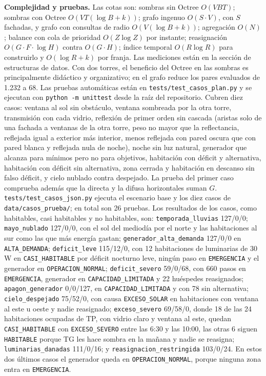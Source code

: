 \documentclass[12pt,a4paper]{article}
\newcommand{\estado}[1]{\texttt{#1}}
\newcommand{\codigo}[1]{\texttt{#1}}
\begin{document}
\textbf{Complejidad y pruebas.} Las cotas son: sombras sin Octree $O(VBT)$; sombras con Octree $O(VT(\log B+k))$; grafo ingenuo $O(S\cdot V)$, con $S$ fachadas, y grafo con consultas de radio $O(V(\log B+k))$; agregación $O(N)$; balance con cola de prioridad $O(Z\log Z)$ por instante; reasignación $O(G\cdot F\cdot\log H)$ contra $O(G\cdot H)$; índice temporal $O(R\log R)$ para construirlo y $O(\log R+k)$ por franja. Las mediciones están en la sección de estructuras de datos. Con dos torres, el beneficio del Octree en las sombras es principalmente didáctico y organizativo; en el grafo reduce los pares evaluados de 1.232 a 68. Las pruebas automáticas están en \codigo{tests/test\_casos\_plan.py} y se ejecutan con \codigo{python -m unittest} desde la raíz del repositorio. Cubren diez casos: ventana al sol sin obstáculo, ventana sombreada por la otra torre, transmisión con cada vidrio, reflexión de primer orden sin cascada (aristas solo de una fachada a ventanas de la otra torre, peso no mayor que la reflectancia, reflejada igual a exterior más interior, menos reflejada con pared oscura que con pared blanca y reflejada nula de noche), noche sin luz natural, generador que alcanza para mínimos pero no para objetivos, habitación con déficit y alternativa, habitación con déficit sin alternativa, zona cerrada y habitación en descanso sin falso déficit, y cielo nublado contra despejado. La prueba del primer caso comprueba además que la directa y la difusa horizontales suman $G$. \codigo{tests/test\_casos\_json.py} ejecuta el escenario base y los diez casos de \codigo{data/casos\_prueba/}; en total son 26 pruebas. Los resultados de los casos, como habitables, casi habitables y no habitables, son: \codigo{temporada\_lluvias} 127/0/0; \codigo{mayo\_nublado} 127/0/0, con el sol del mediodía por el norte y las habitaciones al sur como las que más energía gastan; \codigo{generador\_alta\_demanda} 127/0/0 en \codigo{ALTA\_DEMANDA}; \codigo{deficit\_leve} 115/12/0, con 12 habitaciones de luminarias de 30 W en \estado{CASI\_HABITABLE} por déficit nocturno leve, ningún paso en \estado{EMERGENCIA} y el generador en \estado{OPERACION\_NORMAL}; \codigo{deficit\_severo} 59/0/68, con 660 pasos en \estado{EMERGENCIA}, generador en \estado{CAPACIDAD\_LIMITADA} y 22 huéspedes reasignados; \codigo{apagon\_generador} 0/0/127, en \estado{CAPACIDAD\_LIMITADA} y con 78 sin alternativa; \codigo{cielo\_despejado} 75/52/0, con causa \codigo{EXCESO\_SOLAR} en habitaciones con ventana al este u oeste y nadie reasignado; \codigo{exceso\_severo} 69/58/0, donde 18 de las 24 habitaciones ocupadas de TP, con vidrio claro y ventana al este, quedan \estado{CASI\_HABITABLE} con \estado{EXCESO\_SEVERO} entre las 6:30 y las 10:00, las otras 6 siguen \estado{HABITABLE} porque TG les hace sombra en la mañana y nadie se reasigna; \codigo{luminarias\_danadas} 111/0/16; y \codigo{reasignacion\_restringida} 103/0/24. En estos dos últimos casos el generador queda en \estado{OPERACION\_NORMAL}, porque ninguna zona entra en \estado{EMERGENCIA}.
\end{document}
